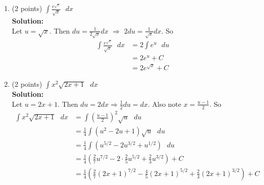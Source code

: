 \documentclass[paper=a4, fontsize=11pt]{scrartcl} %
\numberwithin{equation}{section} %
\numberwithin{figure}{section} %
\numberwithin{table}{section} %
\begin{document}
\begin{enumerate}
\setlength{\itemsep}{0.45in}
\item (2 points) $\displaystyle \int \frac{e^{\sqrt{x}}}{\sqrt{x}} \text{ } dx$\\
\noindent\textbf{Solution:}\\
Let $u = \sqrt{x}$.  Then $du = \frac{1}{2\sqrt{x}}dx$ $\Longrightarrow$ $2 du = \frac{1}{\sqrt{x}} dx$.  So
\begin{align*}
\int \frac{e^{\sqrt{x}}}{\sqrt{x}} \text{ } dx &= 2 \int e^u \text{ } du\\
&=2e^u + C\\
&= 2e^{\sqrt{x}} + C
\end{align*}
\vspace{1.5in}
\item (2 points) $\displaystyle \int x^2\sqrt{2x+1} \text{ } dx$\\
\noindent\textbf{Solution:}\\
Let $u = 2x+1$.  Then $du = 2 dx \Longrightarrow \frac{1}{2} du = dx$.  Also note $x = \frac{u-1}{2}$.  So
\begin{align*}
\int x^2\sqrt{2x+1} \text{ } dx &= \int \left(\frac{u-1}{2}\right)^2\sqrt{u} \text{ } du\\
&= \frac{1}{4}\int (u^2 -2u+1)\sqrt{u} \text{ } du\\
&= \frac{1}{4}\int (u^{5/2} - 2u^{3/2} + u^{1/2})\text{ } du\\
&= \frac{1}{4}\left(\frac{2}{7}u^{7/2}-2\cdot \frac{2}{5}u^{5/2} + \frac{2}{3}u^{3/2} \right) + C \\
&= \frac{1}{4}\left(\frac{2}{7}(2x+1)^{7/2}-\frac{4}{5}(2x+1)^{5/2} + \frac{2}{3}(2x+1)^{3/2} \right) + C
\end{align*}

\newpage


\end{enumerate}
\end{document}
